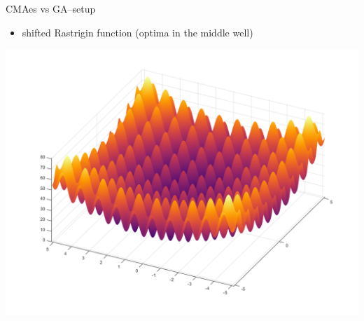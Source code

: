 \documentclass[presentation]{beamer}
\begin{document}
\begin{frame}[label={sec:org9fec8c7}]{CMAes vs GA--setup}
\begin{itemize}
\item shifted Rastrigin function (optima in the middle well)
\end{itemize}
\begin{center}
\includegraphics[width=.9\linewidth]{images/rastrigin.png}
\end{center}
\end{frame}
\end{document}
